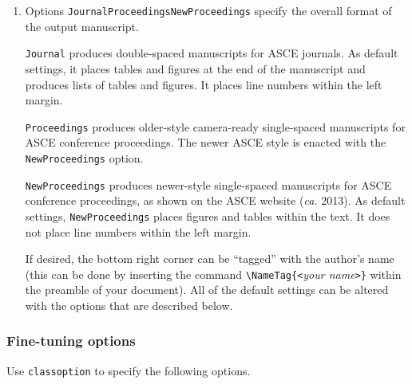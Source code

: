 \documentclass[Journal,LineNumbers]{ascelike-new}
\begin{document}
\begin{enumerate}
\def\labelenumi{\arabic{enumi}.}
\item
  Options \texttt{Journal\textbar{}Proceedings\textbar{}NewProceedings}
  specify the overall format of the output manuscript.

  \texttt{Journal} produces double-spaced manuscripts for ASCE journals.
  As default settings, it places tables and figures at the end of the
  manuscript and produces lists of tables and figures. It places line
  numbers within the left margin.

  \texttt{Proceedings} produces older-style camera-ready single-spaced
  manuscripts for ASCE conference proceedings. The newer ASCE style is
  enacted with the \texttt{NewProceedings} option.

  \texttt{NewProceedings} produces newer-style single-spaced manuscripts
  for ASCE conference proceedings, as shown on the ASCE website
  (\emph{ca.} 2013). As default settings, \texttt{NewProceedings} places
  figures and tables within the text. It does not place line numbers
  within the left margin.

  If desired, the bottom right corner can be ``tagged'' with the
  author's name (this can be done by inserting the command
  \texttt{\textbackslash{}NameTag\{\textless{}}\emph{your
  name}\texttt{\textgreater{}\}} within the preamble of your document).
  All of the default settings can be altered with the options that are
  described below.
\end{enumerate}

\subsubsection{Fine-tuning options}\label{fine-tuning-options}

Use \texttt{classoption} to specify the following options.
\end{document}
